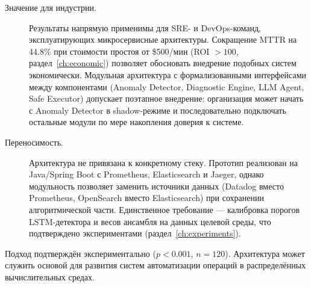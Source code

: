 \begin{description}
\item[Значение для индустрии.] Результаты напрямую применимы для SRE- и DevOps-команд, эксплуатирующих микросервисные архитектуры. Сокращение MTTR на 44.8\% при стоимости простоя от \$500/мин (ROI $> 100$, раздел~\ref{ch:economic}) позволяет обосновать внедрение подобных систем экономически. Модульная архитектура с формализованными интерфейсами между компонентами (Anomaly Detector, Diagnostic Engine, LLM Agent, Safe Executor) допускает поэтапное внедрение: организация может начать с Anomaly Detector в shadow-режиме и последовательно подключать остальные модули по мере накопления доверия к системе.

\item[Переносимость.] Архитектура не привязана к конкретному стеку. Прототип реализован на Java/Spring Boot с Prometheus, Elasticsearch и Jaeger, однако модульность позволяет заменить источники данных (Datadog вместо Prometheus, OpenSearch вместо Elasticsearch) при сохранении алгоритмической части. Единственное требование --- калибровка порогов LSTM-детектора и весов ансамбля на данных целевой среды, что подтверждено экспериментами (раздел~\ref{ch:experiments}).
\end{description}

Подход подтверждён экспериментально ($p < 0.001$, $n = 120$). Архитектура может служить основой для развития систем автоматизации операций в распределённых вычислительных средах.
